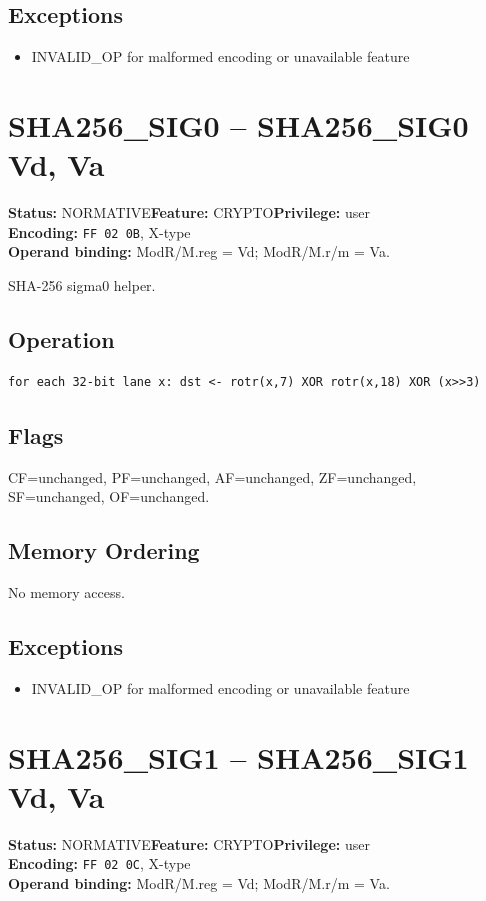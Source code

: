 \documentclass[10pt]{article}
\begin{document}
\subsection*{Exceptions}
\begin{itemize}
\item INVALID\_OP for malformed encoding or unavailable feature
\end{itemize}
\clearpage

\section{SHA256\_SIG0 -- SHA256\_SIG0 Vd, Va}
\textbf{Status:} NORMATIVE\quad \textbf{Feature:} CRYPTO\quad \textbf{Privilege:} user\\
\textbf{Encoding:} \texttt{FF 02 0B}, X-type\\
\textbf{Operand binding:} ModR/M.reg = Vd; ModR/M.r/m = Va.

SHA-256 sigma0 helper.

\subsection*{Operation}
\begin{lstlisting}
for each 32-bit lane x: dst <- rotr(x,7) XOR rotr(x,18) XOR (x>>3)
\end{lstlisting}
\subsection*{Flags}
CF=unchanged, PF=unchanged, AF=unchanged, ZF=unchanged, SF=unchanged, OF=unchanged.
\subsection*{Memory Ordering}
No memory access.
\subsection*{Exceptions}
\begin{itemize}
\item INVALID\_OP for malformed encoding or unavailable feature
\end{itemize}
\clearpage

\section{SHA256\_SIG1 -- SHA256\_SIG1 Vd, Va}
\textbf{Status:} NORMATIVE\quad \textbf{Feature:} CRYPTO\quad \textbf{Privilege:} user\\
\textbf{Encoding:} \texttt{FF 02 0C}, X-type\\
\textbf{Operand binding:} ModR/M.reg = Vd; ModR/M.r/m = Va.
\end{document}
